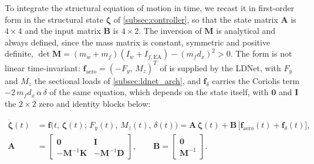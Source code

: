 To integrate the structural equation of motion  in time, we recast it in first-order form in the structural state $\boldsymbol{\zeta}$ of \cref{subsec:controller}, so that the state matrix $\mathbf{A}$ is $4\times4$ and the input matrix $\mathbf{B}$ is $4\times2$. The inversion of $\mathbf{M}$ is analytical and always defined, since the mass matrix  is constant, symmetric and positive definite, $\det\mathbf{M}=(m_w+m_f)(I_w+I_{f,\mathrm{EA}})-(m_f d_x)^2>0$. The form is not linear time-invariant: $\mathbf{f}_{\mathrm{aero}} = (-F_y,\,M_z)^T$ of  is supplied by the LDNet, with $F_y$ and $M_z$ the sectional loads of \cref{subsec:ldnet_arch}, and $\mathbf{f}_{\delta}$ carries the Coriolis term $-2\,m_f d_x\,\dot\alpha\,\dot\delta$ of the same equation, which depends on the state itself, with $\mathbf{0}$ and $\mathbf{I}$ the $2\times2$ zero and identity blocks below:


\begin{equation}
\begin{aligned}
    \dot{\boldsymbol{\zeta}}(t)
    &= \mathbf{f}\bigl(t,\,\boldsymbol{\zeta}(t);\,F_y(t),\,M_z(t),\,\delta(t)\bigr)
     = \mathbf{A}\,\boldsymbol{\zeta}(t)
       + \mathbf{B}\,\bigl[\mathbf{f}_{\mathrm{aero}}(t) + \mathbf{f}_{\delta}(t)\bigr],
    \\[6pt]
    \mathbf{A}
    &= \begin{bmatrix}
         \mathbf{0} & \mathbf{I} \\[2pt]
         -\mathbf{M}^{-1}\mathbf{K} & -\mathbf{M}^{-1}\mathbf{D}
       \end{bmatrix},
    \qquad
    \mathbf{B}
     = \begin{bmatrix}
         \mathbf{0} \\[2pt]
         \mathbf{M}^{-1}
       \end{bmatrix}.
\end{aligned}
    \label{eq:structural-state-space}
\end{equation}

